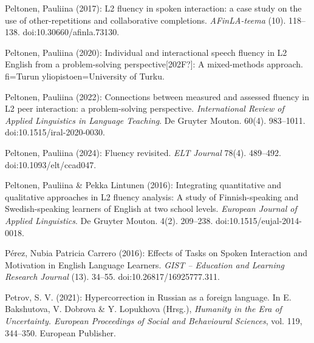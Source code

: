 \begin{styleBibliography}
Peltonen, Pauliina (2017): L2 fluency in spoken interaction: a case study on the use of other-repetitions and collaborative completions. \textit{AFinLA-teema} (10). 118–138. doi:10.30660/afinla.73130.
\end{styleBibliography}

\begin{styleBibliography}
Peltonen, Pauliina (2020): Individual and interactional speech fluency in L2 English from a problem-solving perspective[202F?]: A mixed-methods approach. fi=Turun yliopisto{\textbar}en=University of Turku{\textbar}.
\end{styleBibliography}

\begin{styleBibliography}
Peltonen, Pauliina (2022): Connections between measured and assessed fluency in L2 peer interaction: a problem-solving perspective. \textit{International Review of Applied Linguistics in Language Teaching}. De Gruyter Mouton. 60(4). 983–1011. doi:10.1515/iral-2020-0030.
\end{styleBibliography}

\begin{styleBibliography}
Peltonen, Pauliina (2024): Fluency revisited. \textit{ELT Journal} 78(4). 489–492. doi:10.1093/elt/ccad047.
\end{styleBibliography}

\begin{styleBibliography}
Peltonen, Pauliina \& Pekka Lintunen (2016): Integrating quantitative and qualitative approaches in L2 fluency analysis: A study of Finnish-speaking and Swedish-speaking learners of English at two school levels. \textit{European Journal of Applied Linguistics}. De Gruyter Mouton. 4(2). 209–238. doi:10.1515/eujal-2014-0018.
\end{styleBibliography}

\begin{styleBibliography}
Pérez, Nubia Patricia Carrero (2016): Effects of Tasks on Spoken Interaction and Motivation in English Language Learners. \textit{GIST – Education and Learning Research Journal} (13). 34–55. doi:10.26817/16925777.311.
\end{styleBibliography}

\begin{styleBibliography}
Petrov, S. V. (2021): Hypercorrection in Russian as a foreign language. In E. Bakshutova, V. Dobrova \& Y. Lopukhova (Hrsg.), \textit{Humanity in the Era of Uncertainty. European Proceedings of Social and Behavioural Sciences}, vol. 119, 344–350. European Publisher.
\end{styleBibliography}

